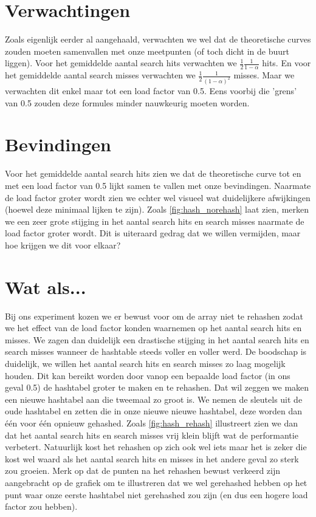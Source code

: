 \documentclass[12pt, dutch]{article}
\begin{document}
\section{Verwachtingen}
Zoals eigenlijk eerder al aangehaald, verwachten we wel dat de theoretische curves zouden moeten samenvallen met onze meetpunten (of toch dicht in de buurt liggen). 
Voor het gemiddelde aantal search hits verwachten we \begin{math} \frac{1}{2}\frac{1}{1 - \alpha} \end{math} hits. En voor het gemiddelde aantal search misses
verwachten we \begin{math} \frac{1}{2}\frac{1}{(1 - \alpha)^2} \end{math} misses.
Maar we verwachten dit enkel maar tot een load factor van 0.5. Eens voorbij die 'grens' van 0.5 zouden deze formules minder nauwkeurig moeten worden.

\section{Bevindingen}
Voor het gemiddelde aantal search hits zien we dat de theoretische curve tot en met een load factor van 0.5 lijkt samen te vallen met onze bevindingen.
Naarmate de load factor groter wordt zien we echter wel visueel wat duidelijkere afwijkingen (hoewel deze minimaal lijken te zijn). Zoals \ref{fig:hash_norehash} laat zien, merken we een zeer grote stijging in het aantal search hits en search misses naarmate 
de load factor groter wordt. Dit is uiteraard gedrag dat we willen vermijden, maar hoe krijgen we dit voor elkaar?

\section{Wat als...}
Bij ons experiment kozen we er bewust voor om de array niet te rehashen zodat we het effect van de load factor konden waarnemen op het aantal search hits en misses. 
We zagen dan duidelijk een drastische stijging in het aantal search hits en search misses wanneer de hashtable steeds voller en voller werd. De boodschap is duidelijk, we willen 
het aantal search hits en search misses zo laag mogelijk houden. Dit kan bereikt worden door vanop een bepaalde load factor (in ons geval 0.5) de hashtabel groter te maken en te rehashen.
Dat wil zeggen we maken een nieuwe hashtabel aan die tweemaal zo groot is. We nemen de sleutels uit de oude hashtabel en zetten die in onze nieuwe nieuwe hashtabel, deze worden dan één voor één opnieuw gehashed. Zoals \ref{fig:hash_rehash} illustreert zien we dan dat het aantal search hits en search misses vrij klein blijft wat de performantie verbetert. Natuurlijk kost het rehashen op zich ook wel iets maar het is zeker die kost wel waard als het aantal search hits en misses 
in het andere geval zo sterk zou groeien. Merk op dat de punten na het rehashen bewust verkeerd zijn aangebracht op de grafiek om te illustreren dat we wel gerehashed hebben op het punt waar onze eerste hashtabel niet gerehashed zou zijn (en dus een hogere load factor zou hebben).
\end{document}
